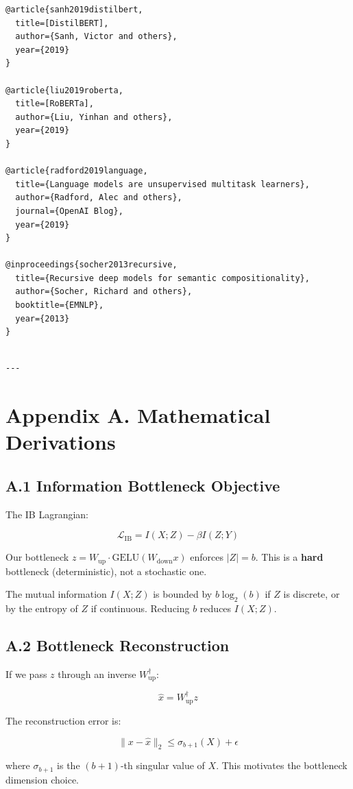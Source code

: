 \begin{lstlisting}
@article{sanh2019distilbert,
  title=[DistilBERT],
  author={Sanh, Victor and others},
  year={2019}
}

@article{liu2019roberta,
  title=[RoBERTa],
  author={Liu, Yinhan and others},
  year={2019}
}

@article{radford2019language,
  title={Language models are unsupervised multitask learners},
  author={Radford, Alec and others},
  journal={OpenAI Blog},
  year={2019}
}

@inproceedings{socher2013recursive,
  title={Recursive deep models for semantic compositionality},
  author={Socher, Richard and others},
  booktitle={EMNLP},
  year={2013}
}
\end{lstlisting}
\begin{lstlisting}

---
\end{lstlisting}

\section{Appendix A. Mathematical Derivations}

\subsection{A.1 Information Bottleneck Objective}

The IB Lagrangian:

\[
\mathcal{L}_\text{IB} = I(X; Z) - \beta I(Z; Y)
\tag{A.1}
\]

Our bottleneck $z = W_\text{up} \cdot \text{GELU}(W_\text{down} x)$ 
enforces $|Z| = b$. This is a \textbf{hard} bottleneck (deterministic), not a 
stochastic one.

The mutual information $I(X; Z)$ is bounded by $b \log_2(b)$ if $Z$ is 
discrete, or by the entropy of $Z$ if continuous. Reducing $b$ reduces 
$I(X; Z)$.

\subsection{A.2 Bottleneck Reconstruction}

If we pass $z$ through an inverse $W_\text{up}^\dagger$:

\[
\hat{x} = W_\text{up}^\dagger z
\tag{A.2}
\]

The reconstruction error is:

\[
\|x - \hat{x}\|_2 \leq \sigma_{b+1}(X) + \epsilon
\tag{A.3}
\]

where $\sigma_{b+1}$ is the $(b+1)$-th singular value of $X$. This 
motivates the bottleneck dimension choice.

